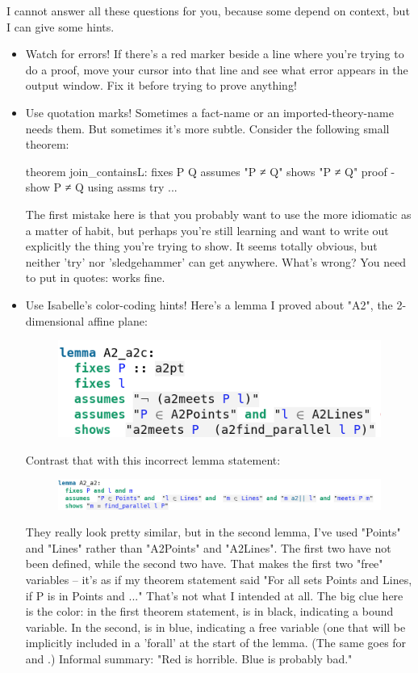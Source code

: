 I cannot answer all these questions for you, because some depend on context, but I can give some hints. 

\begin{itemize}
    \item Watch for errors! If there's a red marker beside a line where you're trying to do a proof, move your cursor into that line and see what error appears in the output window. Fix it before trying to prove anything!

    \item Use quotation marks! Sometimes a fact-name or an imported-theory-name needs them. But sometimes it's more subtle. Consider the following small theorem:
\begin{IS}    
theorem join_containsL:
  fixes P Q
  assumes "P ≠ Q"
  shows "P ≠ Q"
proof -
  show P ≠ Q using assms try 
...
\end{IS}
The first mistake here is that you probably want to use the more idiomatic  as a matter of habit, but perhaps you're still learning and want to write out explicitly the thing you're trying to show. It seems totally obvious, but neither 'try' nor 'sledgehammer' can get anywhere. What's wrong? You need to put  in quotes:
 works fine. 

\item Use Isabelle's color-coding hints! Here's a lemma I proved about "A2", the 2-dimensional affine plane:
\begin{figure}[h]
    \includegraphics[width=0.5\linewidth]{TEXT/C03/Images/good-statement.png}
\end{figure}

Contrast that with this incorrect lemma statement:
\begin{figure}[h]
    \includegraphics[width=\linewidth]{TEXT/C03/Images/bad-statement.png}
\end{figure}
They really look pretty similar, but in the second lemma, I've used "Points" and "Lines" rather than "A2Points" and "A2Lines". The first two have not been defined, while the second two have. That makes the first two "free" variables -- it's as if my theorem statement said "For all sets Points and Lines, if P is in Points and ..."
That's not what I intended at all. The big clue here is the color: in the first theorem statement,  is in black, indicating a bound variable. In the second,  is in blue, indicating a free variable (one that will be implicitly included in a 'forall' at the start of the lemma. (The same goes for  and .) Informal summary: "Red is horrible. Blue is probably bad." 


\end{itemize}
